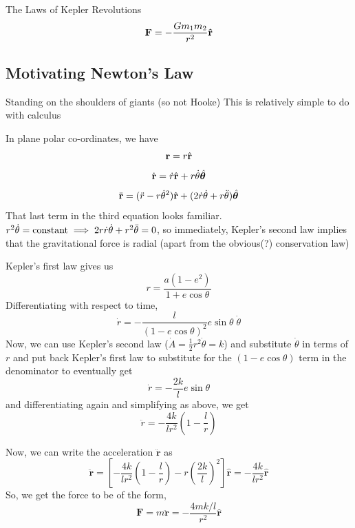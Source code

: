     \begin{frame}{The Laws of Kepler Revolutions}
        \begin{equation}
            \vb{F} = -\frac{Gm_1m_2}{r^2}\vu{r}
            \label{NewtonsLaw}
        \end{equation}
        
    \end{frame}
	
	\subsection{Motivating Newton's Law}
	\frame{\sectionpage}
	\begin{frame}{Standing on the shoulders of giants (so not Hooke)}
		This is relatively simple to do with calculus
	\end{frame}
	
	\begin{frame}
	In plane polar co-ordinates, we have
	$$\vb{r}=r \hat{\vb{r}}$$
	$$\dot{\vb{r}}=\dot{r}\hat{\vb{r}}+r\dot{\theta}\hat{\bm{\theta}}$$
	$$\ddot{\vb{r}}=(\ddot{r}-r\dot{\theta}^2)\hat{\vb{r}}+(2\dot{r}\dot{\theta}+r\ddot{\theta})\hat{\bm{\theta}}$$
	That last term in the third equation looks familiar. 
	$ r^2 \dot{\theta} ={\rm constant }\implies 2r\dot{r}\dot{\theta} + r^2 \ddot{\theta} = 0$, so immediately, Kepler's second law implies that the gravitational force is radial (apart from the obvious(?) conservation law)
	
\end{frame}
	
	\begin{frame}
		Kepler's first law gives us
		$$r = \frac{a(1-e^2)}{1 + e\cos \theta}$$
		Differentiating with respect to time,
		$$\dot{r}=-\frac{l}{(1-e\cos{\theta})^2}e\sin{\theta}\;\dot{\theta}$$
		Now, we can use Kepler's second law ($\dot{A}=\frac{1}{2}r^2\dot{\theta}=k$) and substitute $\dot{\theta}$ in terms of $r$ and put back Kepler's first law to substitute for the $(1-e\cos{\theta})$ term in the denominator to eventually get
		$$\dot{r}=-\frac{2k}{l}e\sin{\theta}$$
		and differentiating again and simplifying as above, we get
		$$\ddot{r}=-\frac{4k}{l r^2}\left(1-\frac{l}{r} \right)$$
	\end{frame}
	
	\begin{frame}
		Now, we can write the acceleration $\ddot{\bm{r}}$ as
		$$\ddot{\bm{r}}=\left[-\frac{4k}{l r^2}\left(1-\frac{l}{r} \right)-r\left(\frac{2k}{l} \right)^2\right]\hat{\bm{r}} = -\frac{4k}{l r^2}\hat{\bm{r}}$$
		So, we get the force to be of the form, 
		$$\bm{F}=m\ddot{\bm{r}}=-\frac{4 m k/l}{r^2}\hat{\bm{r}}$$
	\end{frame}
	
